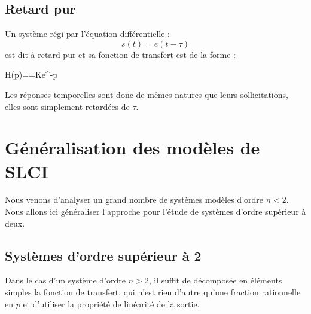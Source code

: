 \subsection{Retard pur}
Un système régi par l'équation différentielle :
\[
s(t)=e(t-\tau)
\]
est dit à retard pur et sa fonction de transfert est de la forme :
\begin{bequation}
    H(p)==Ke^{-\tau p}
\end{bequation}
Les réponses temporelles sont donc de mêmes natures que 
leurs sollicitations, elles sont simplement retardées de $\tau$.
\section{Généralisation des modèles de SLCI}
Nous venons d'analyser un grand nombre de systèmes modèles d'ordre $n<2$. 
Nous allons ici généraliser l'approche pour l'étude de systèmes d'ordre 
supérieur à deux.
\subsection{Systèmes d'ordre supérieur à 2}
Dans le cas d'un système d'ordre $n>2$, il suffit de décomposée en éléments 
simples la fonction de transfert, qui n'est rien d'autre qu'une fraction 
rationnelle en $p$ et d'utiliser la propriété de linéarité de la sortie.

